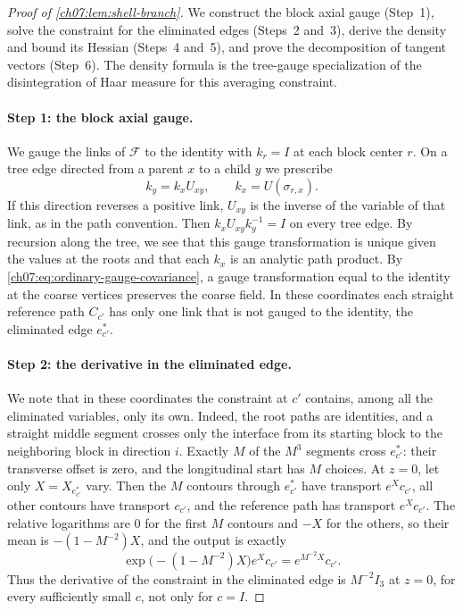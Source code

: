 \begin{proof}[Proof of \cref{ch07:lem:shell-branch}]
We construct the block axial gauge (Step~1), solve the constraint for the eliminated edges (Steps~2 and~3), derive the density and bound its Hessian (Steps~4 and~5), and prove the decomposition of tangent vectors (Step~6). The density formula is the tree-gauge specialization of the disintegration of Haar measure for this averaging constraint.

\paragraph{Step 1: the block axial gauge.}
We gauge the links of $\mathcal F$ to the identity with $k_r=I$ at each block center $r$. On a tree edge directed from a parent $x$ to a child $y$ we prescribe
\begin{equation}\label{ch07:eq:forest-gauge}
 k_y=k_xU_{xy},\qquad k_x=U(\sigma_{r,x}).
\end{equation}
If this direction reverses a positive link, $U_{xy}$ is the inverse of the variable of that link, as in the path convention. Then $k_xU_{xy}k_y^{-1}=I$ on every tree edge. By recursion along the tree, we see that this gauge transformation is unique given the values at the roots and that each $k_x$ is an analytic path product. By \eqref{ch07:eq:ordinary-gauge-covariance}, a gauge transformation equal to the identity at the coarse vertices preserves the coarse field. In these coordinates each straight reference path $C_{c'}$ has only one link that is not gauged to the identity, the eliminated edge $e^*_{c'}$.

\paragraph{Step 2: the derivative in the eliminated edge.}
We note that in these coordinates the constraint at $c'$ contains, among all the eliminated variables, only its own. Indeed, the root paths are identities, and a straight middle segment crosses only the interface from its starting block to the neighboring block in direction $i$. Exactly $M$ of the $M^3$ segments cross $e^*_{c'}$: their transverse offset is zero, and the longitudinal start has $M$ choices. At $z=0$, let only $X=X_{e^*_{c'}}$ vary. Then the $M$ contours through $e^*_{c'}$ have transport $e^Xc_{c'}$, all other contours have transport $c_{c'}$, and the reference path has transport $e^Xc_{c'}$. The relative logarithms are $0$ for the first $M$ contours and $-X$ for the others, so their mean is $-(1-M^{-2})X$, and the output is exactly
\[
 \exp\bigl(-(1-M^{-2})X\bigr)e^Xc_{c'}=e^{M^{-2}X}c_{c'} .
\]
Thus the derivative of the constraint in the eliminated edge is $M^{-2}I_3$ at $z=0$, for every sufficiently small $c$, not only for $c=I$.


\end{proof}
